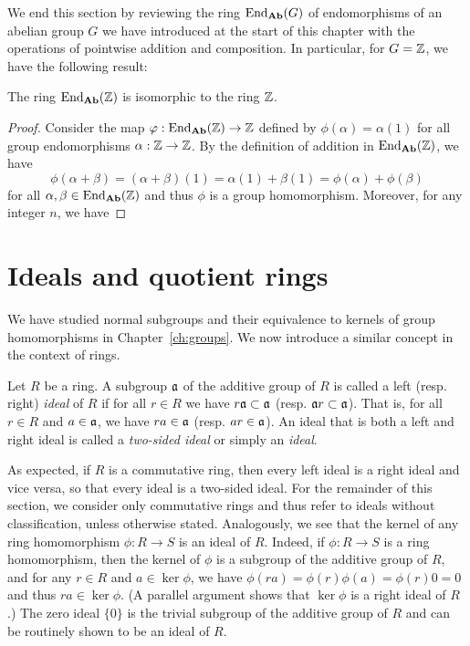 \bigskip

We end this section by reviewing the ring \(\operatorname{End}_{\mathbf{Ab}}(G)\) of endomorphisms of
an abelian group \(G\) we have introduced at the start of this chapter with the
operations of pointwise addition and composition. In particular, for \(G = \mathbb{Z}\),
we have the following result:

\begin{theorem}
    The ring \(\operatorname{End}_{\mathbf{Ab}}(\mathbb{Z})\) is isomorphic to the ring \(\mathbb{Z}\).
\end{theorem}

\begin{proof}
    Consider the map \(\varphi: \operatorname{End}_{\mathbf{Ab}}(\mathbb{Z}) \to \mathbb{Z}\) defined by \(\phi(\alpha) =
    \alpha(1)\) for all group endomorphisms \(\alpha: \mathbb{Z} \to \mathbb{Z}\). By the
    definition of addition in \(\operatorname{End}_{\mathbf{Ab}}(\mathbb{Z})\), we have
    \[
        \phi(\alpha + \beta) = (\alpha + \beta)(1) = \alpha(1) + \beta(1) = \phi(\alpha) + \phi(\beta)
    \]
    for all \(\alpha, \beta \in \operatorname{End}_{\mathbf{Ab}}(\mathbb{Z})\) and thus \(\phi\) is a group
    homomorphism. Moreover, for any integer \(n\), we have
\end{proof}

\section{Ideals and quotient rings}
\label{sec:ideals}

We have studied normal subgroups and their equivalence to kernels of group
homomorphisms in Chapter~\ref{ch:groups}. We now introduce a similar concept in
the context of rings.

\begin{definition}[Ideal]
    \label{def:ideal}
    Let \(R\) be a ring. A subgroup \(\mathfrak{a}\) of the additive group of \(R\)
    is called a left (resp. right) \emph{ideal} of \(R\) if for all \(r \in R\)
    we have \(r\mathfrak{a} \subset \mathfrak{a}\) (resp. \(\mathfrak{a}r \subset \mathfrak{a}\)).
    That is, for all \(r \in R\) and \(a \in \mathfrak{a}\), we have \(ra \in
    \mathfrak{a}\) (resp. \(ar \in \mathfrak{a}\)). An ideal that is both a left and right
    ideal is called a \emph{two-sided ideal} or simply an \emph{ideal}.
\end{definition}

As expected, if \(R\) is a commutative ring, then every left ideal is a right
ideal and vice versa, so that every ideal is a two-sided ideal. For the
remainder of this section, we consider only commutative rings and thus refer to
ideals without classification, unless otherwise stated. Analogously, we see that
the kernel of any ring homomorphism \(\phi: R \to S\) is an ideal of \(R\).
Indeed, if \(\phi: R \to S\) is a ring homomorphism, then the kernel of \(\phi\)
is a subgroup of the additive group of \(R\), and for any \(r \in R\) and \(a
\in \ker \phi\), we have \(\phi(ra) = \phi(r)\phi(a) = \phi(r)0 = 0\) and thus
\(ra \in \ker \phi\). (A parallel argument shows that \(\ker \phi\) is a right
ideal of \(R\).) The zero ideal \(\{0\}\) is the trivial subgroup of the
additive group of \(R\) and can be routinely shown to be an ideal of \(R\).

